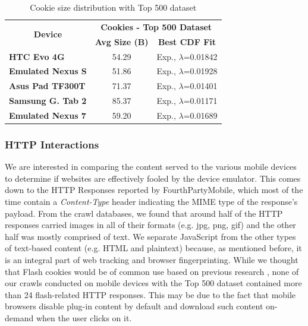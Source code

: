 \documentclass{acm_proc_article-sp}
\begin{document}
\begin{table}[h]
  \centering
  \caption{Cookie size distribution with Top 500 dataset}
    \begin{tabular}{|c|c|c|}
    \hline
    \multicolumn{1}{|c|}{\multirow{2}[4]{*}{\textbf{Device}}} & \multicolumn{2}{|c|}{\textbf{Cookies - Top 500 Dataset}} \\ \cline{2-3}
    \multicolumn{1}{|c|}{} & \textbf{Avg Size (B)} & \textbf{Best CDF Fit} \\ \hline
    \multicolumn{1}{|l|}{\textbf{HTC Evo 4G}} & 54.29 & Exp., $\lambda$=0.01842 \\
    \multicolumn{1}{|l|}{\textbf{Emulated Nexus S}} & 51.86 & Exp., $\lambda$=0.01928 \\
    \multicolumn{1}{|l|}{\textbf{Asus Pad TF300T}} & 71.37 & Exp., $\lambda$=0.01401 \\
    \multicolumn{1}{|l|}{\textbf{Samsung G. Tab 2}} & 85.37 & Exp., $\lambda$=0.01171 \\
    \multicolumn{1}{|l|}{\textbf{Emulated Nexus 7}} & 59.20 & Exp., $\lambda$=0.01689 \\ \hline
    \end{tabular}%
  \label{tab:cookie_sizes}%
\end{table}%

\subsubsection{HTTP Interactions}

We are interested in comparing the content served to the various mobile devices to determine if websites are effectively fooled by the device emulator. This comes down to the HTTP Responses reported by FourthPartyMobile, which most of the time contain a \emph{Content-Type} header indicating the MIME type of the response's payload. From the crawl databases, we found that around half of the HTTP responses carried images in all of their formats (e.g. jpg, png, gif) and the other half was mostly comprised of text. We separate JavaScript from the other types of text-based content (e.g. HTML and plaintext) because, as mentioned before, it is an integral part of web tracking and browser fingerprinting. While we thought that Flash cookies would be of common use based on previous research \cite{FLASH_COOKIES}, none of our crawls conducted on mobile devices with the Top 500 dataset contained more than 24 flash-related HTTP responses. This may be due to the fact that mobile browsers disable plug-in content by default and download such content on-demand when the user clicks on it.
\end{document}
